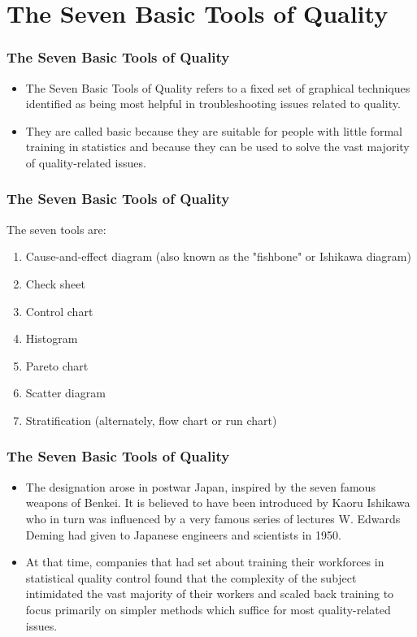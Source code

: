 \documentclass{beamer}
\begin{document}
\begin{frame}
\tableofcontents
\end{frame}

\section{The Seven Basic Tools of Quality }

\begin{frame} %
\frametitle{The Seven Basic Tools of Quality}
\Large
\begin{itemize}
\item The Seven Basic Tools of Quality refers to a fixed set of graphical 
techniques identified as being most helpful in troubleshooting issues related to quality.
\item 
They are called basic because they are suitable for people with little formal training 
in statistics and because they can be used to solve the vast majority of quality-related 
issues.
\end{itemize}
\end{frame}
\begin{frame}
\frametitle{The Seven Basic Tools of Quality}
\Large
The seven tools are:

\begin{enumerate}
\item Cause-and-effect diagram (also known as the "fishbone" or Ishikawa diagram)
\item Check sheet
\item Control chart
\item Histogram
\item Pareto chart
\item Scatter diagram
\item Stratification (alternately, flow chart or run chart)
\end{enumerate}
\end{frame}
\begin{frame}
\frametitle{The Seven Basic Tools of Quality}
\Large
\begin{itemize}
\item The designation arose in postwar Japan, inspired by the seven famous weapons of 
Benkei. It is believed to have been introduced by Kaoru Ishikawa who in turn was influenced by a 
very famous series of lectures W. Edwards Deming had given to Japanese engineers and scientists in 
1950.
\item At that time, companies that had set about training their workforces in statistical quality control found that the complexity of the subject intimidated the vast majority of their workers and scaled back training to focus primarily on simpler methods which suffice for most quality-related issues.
\end{itemize}
\end{frame}
\end{document}
